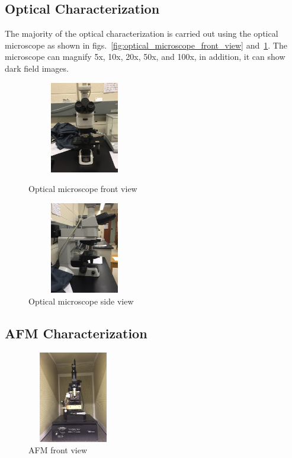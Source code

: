 \subsection{Optical Characterization}\label{subsec:characterization_optical}
The majority of the optical characterization is carried out using the optical microscope as shown in figs.~\ref{fig:optical_microscope_front_view} and~\ref{fig:optical_microscope_side_view}. The microscope can magnify 5x, 10x, 20x, 50x, and 100x, in addition, it can show dark field images.
\begin{figure}[ht]
	\centering
	\begin{minipage}[b]{0.45\linewidth}
		\centering
		\includegraphics[height=4cm,width=5cm]{figs/experimental/optical_microscope_front_view}
		\caption[Optical microscope front view]{Optical microscope front view}
		\label{fig:optical_microscope_front_view}
	\end{minipage}
	\qquad
	\begin{minipage}[b]{0.45\linewidth}
		\centering
		\includegraphics[height=4cm,width=5cm]{figs/experimental/optical_microscope_side_view}
		\caption[Optical microscope side view]{Optical microscope side view}
		\label{fig:optical_microscope_side_view}
	\end{minipage}
\end{figure}

\subsection{AFM Characterization}\label{subsec:characterization_afm}
\begin{figure}[ht]
	\centering
	\includegraphics[height=4cm,width=4cm]{figs/experimental/AFM_front_view}
	\caption[AFM front view]{AFM front view}
	\label{fig:afm_front_view}
\end{figure}

